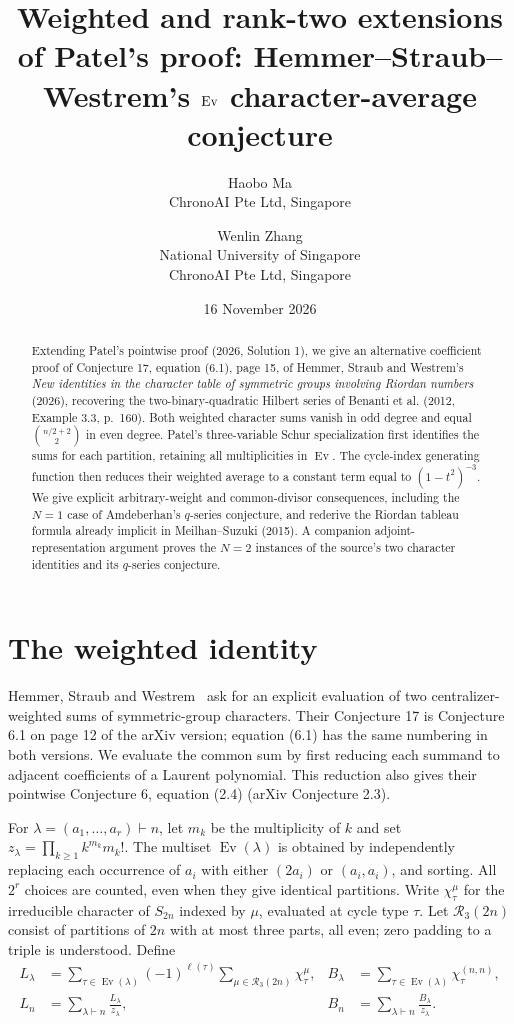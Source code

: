 \documentclass[11pt]{article}
\title{Weighted and rank-two extensions of Patel's proof: Hemmer--Straub--Westrem's $\Ev$ character-average conjecture}
\author{Haobo Ma\\\small ChronoAI Pte Ltd, Singapore
\and Wenlin Zhang\\\small National University of Singapore\\\small ChronoAI Pte Ltd, Singapore}
\date{16 November 2026}
\newcommand{\Ev}{\operatorname{Ev}}
\newcommand{\R}{\mathcal R}
\begin{document}
\maketitle
\begin{abstract}
Extending Patel's pointwise proof (2026, Solution 1), we give an alternative
coefficient proof of Conjecture 17, equation (6.1), page 15, of Hemmer,
Straub and Westrem's
\emph{New identities in the character table of symmetric groups involving
Riordan numbers} (2026), recovering the two-binary-quadratic Hilbert series
of Benanti et al. (2012, Example 3.3, p.~160).
Both weighted character sums vanish in odd degree and equal
$\binom{n/2+2}{2}$ in even degree.
Patel's three-variable Schur specialization first identifies the sums for
each partition, retaining all multiplicities in $\Ev$.
The cycle-index generating function then reduces their weighted average
to a constant term equal to $(1-t^2)^{-3}$.
We give explicit arbitrary-weight and common-divisor consequences, including
the $N=1$ case of Amdeberhan's $q$-series conjecture, and rederive the
Riordan tableau formula already implicit in Meilhan--Suzuki (2015).
A companion adjoint-representation argument proves the $N=2$ instances
of the source's two character identities and its $q$-series conjecture.
\end{abstract}

\section{The weighted identity}
Hemmer, Straub and Westrem~\cite{HSW} ask for an explicit evaluation of
two centralizer-weighted sums of symmetric-group characters.
Their Conjecture 17 is Conjecture 6.1 on page 12 of the arXiv version;
equation (6.1) has the same numbering in both versions.
We evaluate the common sum by first reducing each summand to adjacent
coefficients of a Laurent polynomial. This reduction also gives their
pointwise Conjecture 6, equation (2.4) (arXiv Conjecture 2.3).

For $\lambda=(a_1,\ldots,a_r)\vdash n$, let $m_k$ be the multiplicity
of $k$ and set $z_\lambda=\prod_{k\geq1} k^{m_k}m_k!$.
The multiset $\Ev(\lambda)$ is obtained by independently replacing each
occurrence of $a_i$ with either $(2a_i)$ or $(a_i,a_i)$, and sorting.
All $2^r$ choices are counted, even when they give identical partitions.
Write $\chi^\mu_\tau$ for the irreducible character of $S_{2n}$ indexed
by $\mu$, evaluated at cycle type $\tau$.
Let $\R_3(2n)$ consist of partitions of $2n$ with at most three parts,
all even; zero padding to a triple is understood.
Define
\begin{align*}
 L_\lambda&=\sum_{\tau\in\Ev(\lambda)}(-1)^{\ell(\tau)}
                         \sum_{\mu\in\R_3(2n)}\chi^\mu_\tau,&
 B_\lambda&=\sum_{\tau\in\Ev(\lambda)}\chi^{(n,n)}_\tau,\\
 L_n&=\sum_{\lambda\vdash n}\frac{L_\lambda}{z_\lambda},&
 B_n&=\sum_{\lambda\vdash n}\frac{B_\lambda}{z_\lambda}.
\end{align*}
\end{document}
